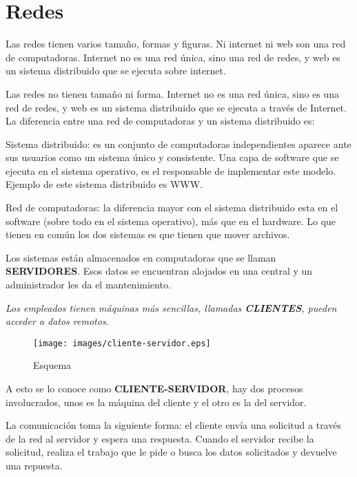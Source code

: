 \documentclass[12pt]{report}
\begin{document}
\section*{Redes}

Las redes tienen varios tama\~no, formas y figuras. Ni internet ni web son una red de computadoras. Internet no es una red \'unica, sino una red de redes, y web es un  sistema distribuido que se ejecuta sobre internet.



Las redes no tienen tama\~no ni forma. Internet no es una red \'unica, sino es una red de redes, y web es un sistema distribuido que se ejecuta a trav\'es de Internet.
La diferencia entre una red de computadoras y un sistema distribuido es:


Sistema distribuido: es un conjunto de computadoras independientes aparece ante 
sus usuarios como un sistema \'unico y consistente. Una capa de software que se ejecuta en el sistema operativo, es el responsable de implementar este modelo. Ejemplo de este sistema distribuido es WWW.     

Red de computadoras: la diferencia mayor con el sistema distribuido esta en el software (sobre todo en el sistema operativo), más que en el hardware. Lo que tienen en común los dos sistemas es que tienen que mover archivos.


Los sistemas están almacenados en computadoras que se llaman {\bf SERVIDORES}. Esos datos se encuentran alojados en una central y un administrador les da el mantenimiento.

\textit {Los empleados tienen m\'aquinas m\'as sencillas, llamadas {\bf CLIENTES},  pueden acceder a datos remotos}.


\begin{figure}[h!]
\texttt{[image: images/cliente-servidor.eps]}
\caption{Esquema}
\label{cliente-servidor}
\end{figure}

A esto se lo conoce como {\bf CLIENTE-SERVIDOR}, hay dos procesos involucrados, unos es la m\'aquina del cliente y el otro es la del servidor.

La comunicaci\'on toma la siguiente forma: el cliente env\'ia una solicitud a trav\'es de la red al servidor y espera una respuesta. Cuando el servidor recibe la solicitud, realiza el trabajo  que le pide o busca los datos solicitados y devuelve una repuesta. 
\end{document}
